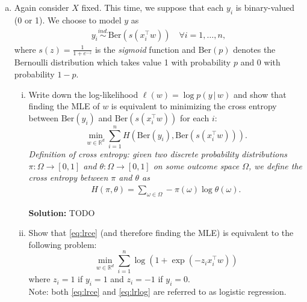 \documentclass{article}
\newenvironment{solution}{\color{blue} \smallskip \textbf{Solution:}}{}
\begin{document}
\begin{enumerate}[(a)]
    Compute the MLE of $\theta = (\theta_1,\ldots, \theta_K)$. Use the fact that the KL divergence is nonnegative: 
    \begin{align*}
        \mathrm{KL}(\pi\,\|\, \theta) = \sum_{\omega\in\Omega} \pi(\omega)\log\left(\frac{\pi(\omega)}{\theta(\omega)}\right)\geq 0.
    \end{align*}

    \begin{solution}
        TODO
    \end{solution}

    \newpage
    \item %
    Again consider $X$ fixed. This time, we suppose that each $y_i$ is binary-valued (0 or 1). We choose to model $y$ as 
    \begin{align*}
        y_i \stackrel{ind.}{\sim} \mathrm{Ber}(s(x_i^\top w))\quad \forall i=1,\ldots, n,
    \end{align*}
    where  $s(z) = \frac{1}{1+e^{-z}}$ is the \textit{sigmoid} function and $\mathrm{Ber}(p)$ denotes the Bernoulli distribution which takes value 1 with probability $p$ and 0 with probability $1-p$. 
    \begin{enumerate}[(i)]
        \item Write down the log-likelihood $\ell(w) = \log p(y\,|\,w)$ and show that finding the MLE of $w$ is equivalent to minimizing the cross entropy between $\mathrm{Ber}(y_i)$ and $\mathrm{Ber}(s(x_i^\top w))$ for each $i$: 
        \begin{equation}
        \label{eq:lrce}
            \min_{w\in\mathbb R^d} \sum_{i=1}^n H(\mathrm{Ber}(y_i), \mathrm{Ber}(s(x_i^\top w))).
        \end{equation}
        \textit{Definition of cross entropy: given two discrete probability distributions $\pi:\Omega\to[0,1]$ and $\theta:\Omega\to[0,1]$ on some outcome space $\Omega$, we define the cross entropy between $\pi$ and $\theta$ as}
        \begin{align*}
            H(\pi, \theta) = \sum_{\omega\in\Omega} -\pi(\omega)\log\theta(\omega).
        \end{align*}

        \begin{solution}
            TODO
        \end{solution}
    
        \item 
        Show that \eqref{eq:lrce} (and therefore finding the MLE) is equivalent to the following problem:
        \begin{equation}
        \label{eq:lrlog}
            \min_{w\in\mathbb R^d} \sum_{i=1}^n \log(1+\exp(-z_i x_i^\top w))
        \end{equation}
        where $z_i = 1$ if $y_i=1$ and $z_i = -1$ if $y_i=0$.\\
        Note: both \eqref{eq:lrce} and \eqref{eq:lrlog} are referred to as logistic regression.
        

\end{enumerate}
\end{enumerate}
\end{document}
